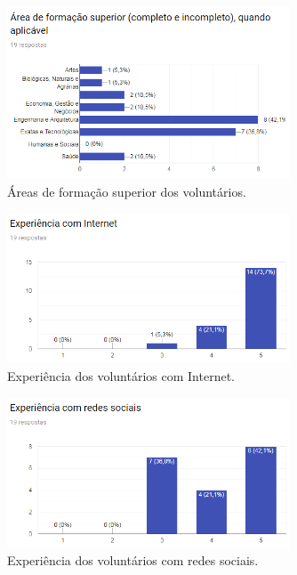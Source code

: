 \begin{figure}[H]
    \caption{Áreas de formação superior dos voluntários.}
       	\begin{center}
            \includegraphics[width=0.75\textwidth]{figuras/avaliacao/area-formacao.png}
        \end{center}
    \label{avalGrafAreasAtuacao}
\end{figure} 

\begin{figure}[h]
    \caption{Experiência dos voluntários com Internet.}
       	\begin{center}
            \includegraphics[width=0.75\textwidth]{figuras/avaliacao/xp-internet.png}
        \end{center}
    \label{avalGrafInternet}
\end{figure} 

\begin{figure}[H]
    \caption{Experiência dos voluntários com redes sociais.}
       	\begin{center}
            \includegraphics[width=0.75\textwidth]{figuras/avaliacao/xp-redes-sociais.png}
        \end{center}
    \label{avalGrafRedesSociais}
\end{figure} 

